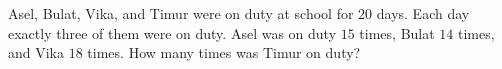 Asel, Bulat, Vika, and Timur were on duty at school for $20$ days. Each day exactly three of them were on duty. Asel was on duty $15$ times, Bulat $14$ times, and Vika $18$ times. How many times was Timur on duty?
